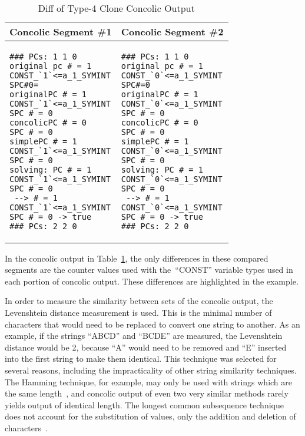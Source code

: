 \documentclass{sig-alternate}
\begin{document}
\noindent
\begin{table}[h] %
\caption{Diff of Type-4 Clone Concolic Output}
~\label{table:concolicoutputcomparision}
\centering
\begin{tabular}{ p{3.8cm} | p{3.8cm} }
\multicolumn{1}{c}{\textbf{Concolic Segment \#1}} & \multicolumn{1}{c}{\textbf{Concolic Segment \#2}} \\ \hline \hline
\begin{lstlisting}[style=ConcolicOutput]
### PCs: 1 1 0
original pc # = 1
CONST_`1`<=a_1_SYMINT
SPC#0=
originalPC # = 1
CONST_`1`<=a_1_SYMINT
SPC # = 0
concolicPC # = 0
SPC # = 0
simplePC # = 1
CONST_`1`<=a_1_SYMINT
SPC # = 0
solving: PC # = 1
CONST_`1`<=a_1_SYMINT
SPC # = 0
 --> # = 1
CONST_`1`<=a_1_SYMINT
SPC # = 0 -> true
### PCs: 2 2 0
\end{lstlisting}
&
\begin{lstlisting}[style=ConcolicOutput]
### PCs: 1 1 0
original pc # = 1
CONST_`0`<=a_1_SYMINT
SPC#=0
originalPC # = 1
CONST_`0`<=a_1_SYMINT
SPC # = 0
concolicPC # = 0
SPC # = 0
simplePC # = 1
CONST_`0`<=a_1_SYMINT
SPC # = 0
solving: PC # = 1
CONST_`0`<=a_1_SYMINT
SPC # = 0
 --> # = 1
CONST_`0`<=a_1_SYMINT
SPC # = 0 -> true
### PCs: 2 2 0
\end{lstlisting}

\end{tabular}

\end{table}


In the concolic output in Table~\ref{table:concolicoutputcomparision}, the only differences in these compared segments are the counter values used with the~``CONST'' variable types used in each portion of concolic output. These differences are highlighted in the example.

In order to measure the similarity between sets of the concolic output, the Levenshtein distance measurement is used. This is the minimal number of characters that would need to be replaced to convert one string to another. As an example, if the strings ``ABCD'' and ``BCDE'' are measured, the Levenshtein distance would be 2, because ``A'' would need to be removed and ``E'' inserted into the first string to make them identical. This technique was selected for several reasons, including the impracticality of other string similarity techniques. The Hamming technique, for example, may only be used with strings which are the same length~\cite{Ros:2005:PRR:1086297.1086311, Jain:2012:HES:2324796.2324820}, and concolic output of even two very similar methods rarely yields output of identical length. The longest common subsequence technique does not account for the substitution of values, only the addition and deletion of characters~\cite{Li:2008:SEA:1593105.1593164}.
\end{document}
